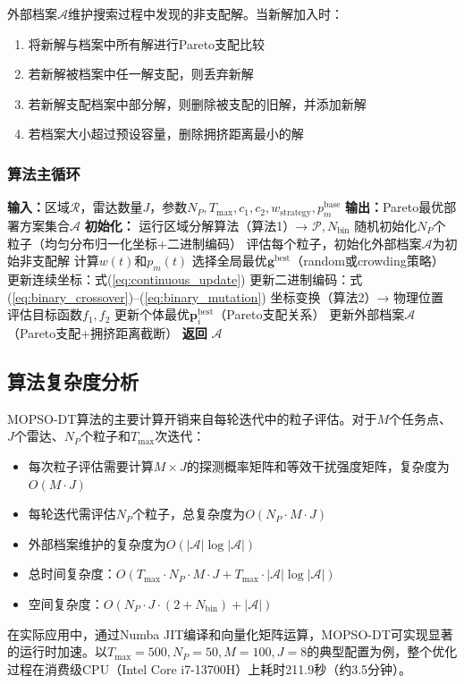 外部档案$\mathcal{A}$维护搜索过程中发现的非支配解。当新解加入时：
\begin{enumerate}
    \item 将新解与档案中所有解进行Pareto支配比较
    \item 若新解被档案中任一解支配，则丢弃新解
    \item 若新解支配档案中部分解，则删除被支配的旧解，并添加新解
    \item 若档案大小超过预设容量，删除拥挤距离最小的解
\end{enumerate}

\subsubsection{算法主循环}

\begin{algorithm}[t]
\caption{MOPSO-DT多目标部署优化}
\label{alg:mopso_dt}
\begin{algorithmic}[1]
\STATE \textbf{输入：}区域$\mathcal{R}$，雷达数量$J$，参数$N_P, T_{\max}, c_1, c_2, w_{\text{strategy}}, p_m^{\text{base}}$
\STATE \textbf{输出：}Pareto最优部署方案集合$\mathcal{A}$
\STATE \textbf{初始化：}
\STATE \quad 运行区域分解算法（算法1）→ $\mathcal{P}, N_{\text{bin}}$
\STATE \quad 随机初始化$N_P$个粒子（均匀分布归一化坐标+二进制编码）
\STATE \quad 评估每个粒子，初始化外部档案$\mathcal{A}$为初始非支配解
    \STATE 计算$w(t)$和$p_m(t)$
        \STATE 选择全局最优$\mathbf{g}^{\text{best}}$（random或crowding策略）
        \STATE 更新连续坐标：式(\ref{eq:continuous_update})
        \STATE 更新二进制编码：式(\ref{eq:binary_crossover})--(\ref{eq:binary_mutation})
        \STATE 坐标变换（算法2）→ 物理位置
        \STATE 评估目标函数$f_1, f_2$
        \STATE 更新个体最优$\mathbf{p}_i^{\text{best}}$（Pareto支配关系）
    \ENDFOR
    \STATE 更新外部档案$\mathcal{A}$（Pareto支配+拥挤距离截断）
\ENDFOR
\STATE \textbf{返回} $\mathcal{A}$
\end{algorithmic}
\end{algorithm}

\subsection{算法复杂度分析}

MOPSO-DT算法的主要计算开销来自每轮迭代中的粒子评估。对于$M$个任务点、$J$个雷达、$N_P$个粒子和$T_{\max}$次迭代：

\begin{itemize}
    \item 每次粒子评估需要计算$M \times J$的探测概率矩阵和等效干扰强度矩阵，复杂度为$O(M \cdot J)$
    \item 每轮迭代需评估$N_P$个粒子，总复杂度为$O(N_P \cdot M \cdot J)$
    \item 外部档案维护的复杂度为$O(|\mathcal{A}| \log |\mathcal{A}|)$
    \item 总时间复杂度：$O(T_{\max} \cdot N_P \cdot M \cdot J + T_{\max} \cdot |\mathcal{A}| \log |\mathcal{A}|)$
    \item 空间复杂度：$O(N_P \cdot J \cdot (2 + N_{\text{bin}}) + |\mathcal{A}|)$
\end{itemize}

在实际应用中，通过Numba JIT编译和向量化矩阵运算，MOPSO-DT可实现显著的运行时加速。以$T_{\max}=500, N_P=50, M=100, J=8$的典型配置为例，整个优化过程在消费级CPU（Intel Core i7-13700H）上耗时211.9秒（约3.5分钟）。
